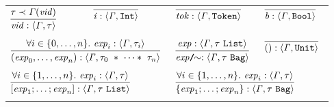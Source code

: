 \documentclass[final]{article}
\begin{document}
\begin{figure}[t]
\begin{small}
\begin{center}
  \begin{tabular}{llll}
    $\MEMinferb
    {\MEMtyping{\METAvid}{\METAityenv}{\METAity}}
    {\MEMinstance{\METAity}{\MEMafunc{\METAityenv}{\METAvid}}}$

    &

    $\MEMinfera
    {\MEMtyping{\METAint}{\METAityenv}{\CONSintty}}$

    &

    $\MEMinfera
    {\MEMtyping{\METAatom}{\METAityenv}{\CONSatomty}}$

    &

    $\MEMinfera
    {\MEMtyping{\METAbool}{\METAityenv}{\CONSboolty}}$

    \\
    &&&
    \\

    \multicolumn{2}{l}{
      $\MEMinferb
      {\MEMtyping{\CONStupn{\METAexp_0}{\METAexp_n}}{\METAityenv}{\CONStuptyn{\METAity_0}{\METAity_n}}}
      {\forallexp{i\in\{0,\dots,n\}}{\MEMtyping{\METAexp_i}{\METAityenv}{\METAity_i}}}$
    }

    &

    \multicolumn{1}{l}{
      $\MEMinferb
      {\MEMtyping{\CONSquotient{\METAexp}}{\METAityenv}{\CONSconsty{\METAity}{\CONSbagty}}}
      {\MEMtyping{\METAexp}{\METAityenv}{\CONSconsty{\METAity}{\CONSlistty}}}$
    }

    &

    \multicolumn{1}{l}{
      $\MEMinfera
      {\MEMtyping{()}{\METAityenv}{\CONSunitty}}$
    }

    \\
    &&&
    \\

    \multicolumn{2}{l}{
      $\MEMinferb
      {\MEMtyping{\CONSlistn{\METAexp_1}{\METAexp_n}}{\METAityenv}{\CONSconsty{\METAity}{\CONSlistty}}}
      {\forallexp{i\in\{1,\dots,n\}}{\MEMtyping{\METAexp_i}{\METAityenv}{\METAity}}}$
    }

    &

    \multicolumn{2}{l}{
      $\MEMinferb
      {\MEMtyping{\CONSbagn{\METAexp_1}{\METAexp_n}}{\METAityenv}{\CONSconsty{\METAity}{\CONSbagty}}}
      {\forallexp{i\in\{1,\dots,n\}}{\MEMtyping{\METAexp_i}{\METAityenv}{\METAity}}}$
    }

    \\
    &&&
    \\


\end{tabular}
\end{center}
\end{small}
\end{figure}
\end{document}
